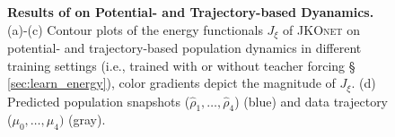 \begin{figure}[h]
\vspace{-10pt}
\caption{\textbf{Results of  on Potential- and Trajectory-based Dyanamics.} (a)-(c) Contour plots of the energy functionals $J_\xi$ of \textsc{JKOnet} on potential- and trajectory-based population dynamics in different training settings (i.e., trained with or without teacher forcing \S~ \ref{sec:learn_energy}), color gradients depict the magnitude of $J_\xi$. (d) Predicted population snapshots ($\hat{\rho}_1, \dots, \hat{\rho}_4$) (blue) and data trajectory ($\mu_0, \dots, \mu_4)$ (gray).}
\label{fig:exp_jkonet_pot_traj}
\end{figure}

